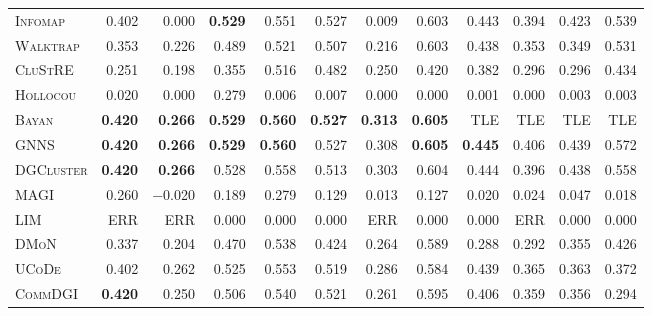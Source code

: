 \documentclass[11pt,a4paper]{article}
\begin{document}
\begin{table}[H]
\begin{tabular}{l >{\columncolor{gray!12}}r >{\columncolor{gray!12}}r >{\columncolor{gray!12}}r >{\columncolor{gray!12}}r >{\columncolor{gray!12}}r r >{\columncolor{gray!12}}r r r r r}
        \textsc{Infomap} & 0.402 & 0.000 & \textbf{0.529} & 0.551 & 0.527 & 0.009 & 0.603 & 0.443 & 0.394 & 0.423 & 0.539 \\
        \textsc{Walktrap} & 0.353 & 0.226 & 0.489 & 0.521 & 0.507 & 0.216 & 0.603 & 0.438 & 0.353 & 0.349 & 0.531 \\
        \textsc{CluStRE} & 0.251 & 0.198 & 0.355 & 0.516 & 0.482 & 0.250 & 0.420 & 0.382 & 0.296 & 0.296 & 0.434 \\
        \textsc{Hollocou} & 0.020 & 0.000 & 0.279 & 0.006 & 0.007 & 0.000 & 0.000 & 0.001 & 0.000 & 0.003 & 0.003 \\
        \textsc{Bayan} & \textbf{0.420} & \textbf{0.266} & \textbf{0.529} & \textbf{0.560} & \textbf{0.527} & \textbf{0.313} & \textbf{0.605} & TLE & TLE & TLE & TLE \\
        \midrule
        \textsc{GNNS} & \textbf{0.420} & \textbf{0.266} & \textbf{0.529} & \textbf{0.560} & 0.527 & 0.308 & \textbf{0.605} & \textbf{0.445} & 0.406 & 0.439 & 0.572 \\
        \textsc{DGCluster} & \textbf{0.420} & \textbf{0.266} & 0.528 & 0.558 & 0.513 & 0.303 & 0.604 & 0.444 & 0.396 & 0.438 & 0.558 \\
        \textsc{MAGI} & 0.260 & $-$0.020 & 0.189 & 0.279 & 0.129 & 0.013 & 0.127 & 0.020 & 0.024 & 0.047 & 0.018 \\
        \textsc{LIM} & ERR & ERR & 0.000 & 0.000 & 0.000 & ERR & 0.000 & 0.000 & ERR & 0.000 & 0.000 \\
        \textsc{DMoN} & 0.337 & 0.204 & 0.470 & 0.538 & 0.424 & 0.264 & 0.589 & 0.288 & 0.292 & 0.355 & 0.426 \\
        \textsc{UCoDe} & 0.402 & 0.262 & 0.525 & 0.553 & 0.519 & 0.286 & 0.584 & 0.439 & 0.365 & 0.363 & 0.372 \\
        \textsc{CommDGI} & \textbf{0.420} & 0.250 & 0.506 & 0.540 & 0.521 & 0.261 & 0.595 & 0.406 & 0.359 & 0.356 & 0.294 \\
        \bottomrule
    \end{tabular}
\end{table}
\end{document}
